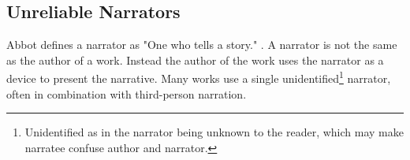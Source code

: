 \subsection{Unreliable Narrators}
Abbot defines a narrator as "One who tells a story." \cite[p. 238]{Abbot}. A narrator is not the same as the author of a work. Instead the author of the work uses the narrator as a device to present the narrative. Many works use a single unidentified\footnote{Unidentified as in the narrator being unknown to the reader, which may make narratee confuse author and narrator.} narrator, often in combination with third-person narration.